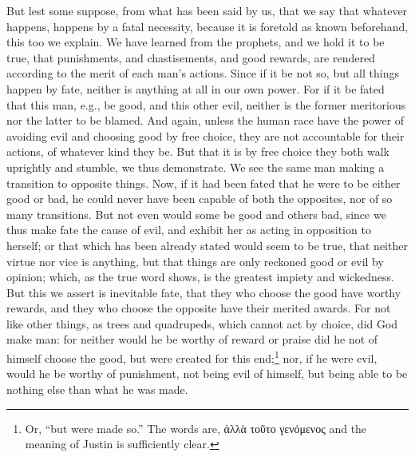 
But lest some suppose, from what has been said by us, that we say that whatever happens, happens by a fatal necessity, because it is foretold as known beforehand, this too we explain. We have learned from the prophets, and we hold it to be true, that punishments, and chastisements, and good rewards, are rendered according to the merit of each man’s actions. Since if it be not so, but all things happen by fate, neither is anything at all in our own power. For if it be fated that this man, e.g., be good, and this other evil, neither is the former meritorious nor the latter to be blamed. And again, unless the human race have the power of avoiding evil and choosing good by free choice, they are not accountable for their actions, of whatever kind they be. But that it is by free choice they both walk uprightly and stumble, we thus demonstrate. We see the same man making a transition to opposite things. Now, if it had been fated that he were to be either good or bad, he could never have been capable of both the opposites, nor of so many transitions. But not even would some be good and others bad, since we thus make fate the cause of evil, and exhibit her as acting in opposition to herself; or that which has been already stated would seem to be true, that neither virtue nor vice is anything, but that things are only reckoned good or evil by opinion; which, as the true word shows, is the greatest impiety and wickedness. But this we assert is inevitable fate, that they who choose the good have worthy rewards, and they who choose the opposite have their merited awards. For not like other things, as trees and quadrupeds, which cannot act by choice, did God make man: for neither would he be worthy of reward or praise did he not of himself choose the good, but were created for this end;\footnote{Or, “but were made so.” The words are, \textgreek{ἀλλὰ τοῦτο γενόμενος} and the meaning of Justin is sufficiently clear.} nor, if he were evil, would he be worthy of punishment, not being evil of himself, but being able to be nothing else than what he was made.


